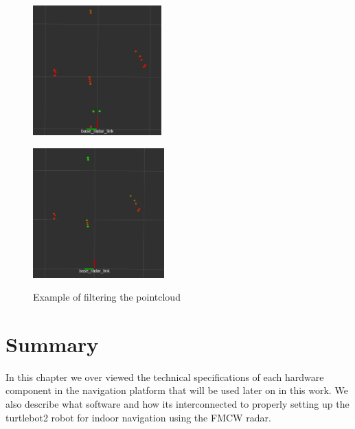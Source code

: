 \begin{figure}[ht!] 
    \begin{minipage}[b]{.49\linewidth}
        \includegraphics[height=5cm,width=\linewidth]{imgs/chapter4/notfilt.png}
        \label{fig:nonfilt}
    \end{minipage}
    \begin{minipage}[b]{.49\linewidth}
        \includegraphics[height=5cm,width=\linewidth]{imgs/chapter4/filt.png}
        \label{fig:filt}
    \end{minipage}
    \caption{Example of filtering the pointcloud}
    \label{fig:filters}
\end{figure}


\section{Summary}
In this chapter we over viewed the technical specifications of each hardware component in the navigation platform that will be used later on in this work. We also describe what software and how its interconnected  to properly setting up the turtlebot2 robot for indoor navigation using the \ac{FMCW} \ac{radar}.



